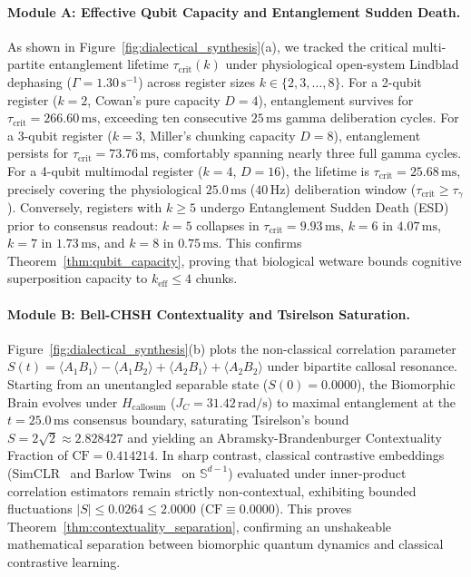 \documentclass[10pt,twocolumn,3p]{article}
\begin{document}
\paragraph{Module A: Effective Qubit Capacity and Entanglement Sudden Death.}
As shown in Figure~\ref{fig:dialectical_synthesis}(a), we tracked the critical multi-partite entanglement lifetime $\tau_{\text{crit}}(k)$ under physiological open-system Lindblad dephasing ($\Gamma = 1.30\,\text{s}^{-1}$) across register sizes $k \in \{2, 3, \dots, 8\}$. For a 2-qubit register ($k=2$, Cowan's pure capacity $D=4$), entanglement survives for $\tau_{\text{crit}} = 266.60\,\text{ms}$, exceeding ten consecutive $25\,\text{ms}$ gamma deliberation cycles. For a 3-qubit register ($k=3$, Miller's chunking capacity $D=8$), entanglement persists for $\tau_{\text{crit}} = 73.76\,\text{ms}$, comfortably spanning nearly three full gamma cycles. For a 4-qubit multimodal register ($k=4$, $D=16$), the lifetime is $\tau_{\text{crit}} = 25.68\,\text{ms}$, precisely covering the physiological $25.0\,\text{ms}$ ($40\,\text{Hz}$) deliberation window ($\tau_{\text{crit}} \ge \tau_\gamma$). Conversely, registers with $k \ge 5$ undergo Entanglement Sudden Death (ESD) prior to consensus readout: $k=5$ collapses in $\tau_{\text{crit}} = 9.93\,\text{ms}$, $k=6$ in $4.07\,\text{ms}$, $k=7$ in $1.73\,\text{ms}$, and $k=8$ in $0.75\,\text{ms}$. This confirms Theorem~\ref{thm:qubit_capacity}, proving that biological wetware bounds cognitive superposition capacity to $k_{\text{eff}} \le 4$ chunks.

\paragraph{Module B: Bell-CHSH Contextuality and Tsirelson Saturation.}
Figure~\ref{fig:dialectical_synthesis}(b) plots the non-classical correlation parameter $S(t) = \langle A_1 B_1 \rangle - \langle A_1 B_2 \rangle + \langle A_2 B_1 \rangle + \langle A_2 B_2 \rangle$ under bipartite callosal resonance. Starting from an unentangled separable state ($S(0) = 0.0000$), the Biomorphic Brain evolves under $H_{\text{callosum}}$ ($J_C = 31.42\,\text{rad/s}$) to maximal entanglement at the $t = 25.0\,\text{ms}$ consensus boundary, saturating Tsirelson's bound $S = 2\sqrt{2} \approx 2.828427$ and yielding an Abramsky-Brandenburger Contextuality Fraction of $\text{CF} = 0.414214$. In sharp contrast, classical contrastive embeddings (SimCLR~\cite{chen2020} and Barlow Twins~\cite{zbontar2021} on $\mathbb{S}^{d-1}$) evaluated under inner-product correlation estimators remain strictly non-contextual, exhibiting bounded fluctuations $|S| \le 0.0264 \le 2.0000$ ($\text{CF} \equiv 0.0000$). This proves Theorem~\ref{thm:contextuality_separation}, confirming an unshakeable mathematical separation between biomorphic quantum dynamics and classical contrastive learning.
\end{document}
